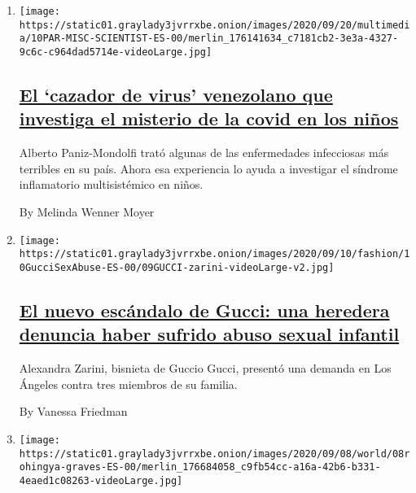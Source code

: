 \begin{enumerate}
\def\labelenumi{\arabic{enumi}.}
\item
  \texttt{[image: https://static01.graylady3jvrrxbe.onion/images/2020/09/20/multimedia/10PAR-MISC-SCIENTIST-ES-00/merlin\_176141634\_c7181cb2-3e3a-4327-9c6c-c964dad5714e-videoLarge.jpg]}

  \hypertarget{el-cazador-de-virus-venezolano-que-investiga-el-misterio-de-la-covid-en-los-niuxf1os}{%
  \subsection{\texorpdfstring{\href{/es/2020/09/10/espanol/ciencia-y-tecnologia/Alberto-Paniz-Mondolf-coronavirus-ninos.html}{El
  `cazador de virus' venezolano que investiga el misterio de la covid en
  los
  niños}}{El `cazador de virus' venezolano que investiga el misterio de la covid en los niños}}\label{el-cazador-de-virus-venezolano-que-investiga-el-misterio-de-la-covid-en-los-niuxf1os}}

  Alberto Paniz-Mondolfi trató algunas de las enfermedades infecciosas
  más terribles en su país. Ahora esa experiencia lo ayuda a investigar
  el síndrome inflamatorio multisistémico en niños.

  By Melinda Wenner Moyer
\item
  \texttt{[image: https://static01.graylady3jvrrxbe.onion/images/2020/09/10/fashion/10GucciSexAbuse-ES-00/09GUCCI-zarini-videoLarge-v2.jpg]}

  \hypertarget{el-nuevo-escuxe1ndalo-de-gucci-una-heredera-denuncia-haber-sufrido-abuso-sexual-infantil}{%
  \subsection{\texorpdfstring{\href{/es/2020/09/10/espanol/estilos-de-vida/gucci-abuso-sexual.html}{El
  nuevo escándalo de Gucci: una heredera denuncia haber sufrido abuso
  sexual
  infantil}}{El nuevo escándalo de Gucci: una heredera denuncia haber sufrido abuso sexual infantil}}\label{el-nuevo-escuxe1ndalo-de-gucci-una-heredera-denuncia-haber-sufrido-abuso-sexual-infantil}}

  Alexandra Zarini, bisnieta de Guccio Gucci, presentó una demanda en
  Los Ángeles contra tres miembros de su familia.

  By Vanessa Friedman
\item
  \texttt{[image: https://static01.graylady3jvrrxbe.onion/images/2020/09/08/world/08rohingya-graves-ES-00/merlin\_176684058\_c9fb54cc-a16a-42b6-b331-4eaed1c08263-videoLarge.jpg]}


\end{enumerate}
